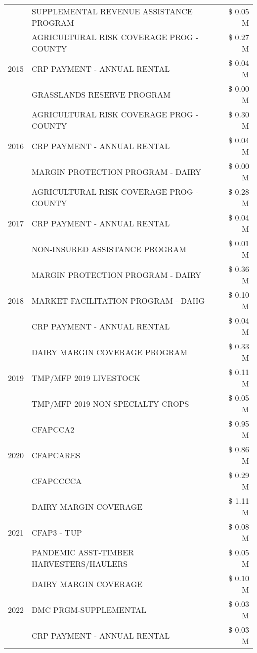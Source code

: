 \begin{tabular}{llr}
 & SUPPLEMENTAL REVENUE ASSISTANCE PROGRAM & \$ 0.05 M \\
\cline{1-3}
\multirow[t]{3}{*}{2015} & AGRICULTURAL RISK COVERAGE PROG - COUNTY & \$ 0.27 M \\
 & CRP PAYMENT - ANNUAL RENTAL & \$ 0.04 M \\
 & GRASSLANDS RESERVE PROGRAM & \$ 0.00 M \\
\cline{1-3}
\multirow[t]{3}{*}{2016} & AGRICULTURAL RISK COVERAGE PROG - COUNTY & \$ 0.30 M \\
 & CRP PAYMENT - ANNUAL RENTAL & \$ 0.04 M \\
 & MARGIN PROTECTION PROGRAM - DAIRY & \$ 0.00 M \\
\cline{1-3}
\multirow[t]{3}{*}{2017} & AGRICULTURAL RISK COVERAGE PROG - COUNTY & \$ 0.28 M \\
 & CRP PAYMENT - ANNUAL RENTAL & \$ 0.04 M \\
 & NON-INSURED ASSISTANCE PROGRAM & \$ 0.01 M \\
\cline{1-3}
\multirow[t]{3}{*}{2018} & MARGIN PROTECTION PROGRAM - DAIRY & \$ 0.36 M \\
 & MARKET FACILITATION PROGRAM - DAHG & \$ 0.10 M \\
 & CRP PAYMENT - ANNUAL RENTAL & \$ 0.04 M \\
\cline{1-3}
\multirow[t]{3}{*}{2019} & DAIRY MARGIN COVERAGE PROGRAM & \$ 0.33 M \\
 & TMP/MFP 2019 LIVESTOCK & \$ 0.11 M \\
 & TMP/MFP 2019 NON SPECIALTY CROPS & \$ 0.05 M \\
\cline{1-3}
\multirow[t]{3}{*}{2020} & CFAPCCA2 & \$ 0.95 M \\
 & CFAPCARES & \$ 0.86 M \\
 & CFAPCCCCA & \$ 0.29 M \\
\cline{1-3}
\multirow[t]{3}{*}{2021} & DAIRY MARGIN COVERAGE & \$ 1.11 M \\
 & CFAP3 - TUP & \$ 0.08 M \\
 & PANDEMIC ASST-TIMBER HARVESTERS/HAULERS & \$ 0.05 M \\
\cline{1-3}
\multirow[t]{3}{*}{2022} & DAIRY MARGIN COVERAGE & \$ 0.10 M \\
 & DMC PRGM-SUPPLEMENTAL & \$ 0.03 M \\
 & CRP PAYMENT - ANNUAL RENTAL & \$ 0.03 M \\
\cline{1-3}
\bottomrule
\end{tabular}
